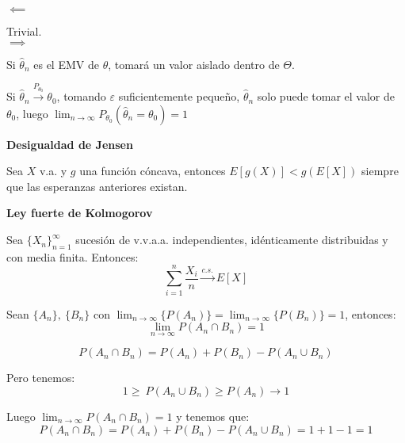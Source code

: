 \documentclass[openany]{book}
\begin{document}
\begin{demonstration}
    $  $\\
    $ \impliedby $

    Trivial.\\
    $ \implies $

    Si $ \hat{\theta}_{n} $ es el EMV de $ \theta $, tomará un valor aislado dentro de $ \Theta $.
    
    Si $ \hat{\theta}_{n} \xrightarrow{P_{\theta_0}} \theta_0 $, tomando $ \varepsilon $ suficientemente pequeño, $ \hat{\theta}_{n} $ solo puede tomar el valor de $ \theta_0   $, luego $ \lim_{n \to \infty}P_{\theta_0}(\hat{\theta}_{n} = \theta_0) = 1 $


\end{demonstration}

\begin{proposition}
    \textbf{Desigualdad de Jensen}

    Sea $ X $ v.a. y $ g $ una función cóncava, entonces $ E[g(X)]<g(E[X]) $ siempre que las esperanzas anteriores existan.
\end{proposition}

\begin{proposition}
    \textbf{Ley fuerte de Kolmogorov}

    Sea $ \{X_n\}_{n=1}^{\infty} $ sucesión de v.v.a.a. independientes, idénticamente distribuidas y con media finita. Entonces:
    $$ \sum\limits_{i=1}^{n} \dfrac{X_i}{n} \xrightarrow{c.s.} E[X] $$
\end{proposition}

\begin{lemma}
    Sean $ \{A_n\},\ \{B_n\} $ con $ \lim_{n \to \infty}\{P(A_n)\} = \lim_{n \to \infty} \{P(B_n)\} = 1 $, entonces:
    $$ \lim_{n \to \infty} P(A_n \cap B_n) = 1 $$
\end{lemma}

\begin{demonstration}
    $$ P(A_n \cap B_n) = P(A_n) + P(B_n) - P(A_n \cup B_n) $$
    
    Pero tenemos:
    $$ 1 \geq\ P(A_n\cup B_n) \geq P(A_n) \to 1 $$
    
    Luego $ \lim_{n \to \infty}P(A_n \cap B_n) = 1 $ y tenemos que:
    $$ P(A_n \cap B_n) = P(A_n) + P(B_n) - P(A_n \cup B_n) = 1 +1-1 =1 $$

\end{demonstration}
\end{document}
